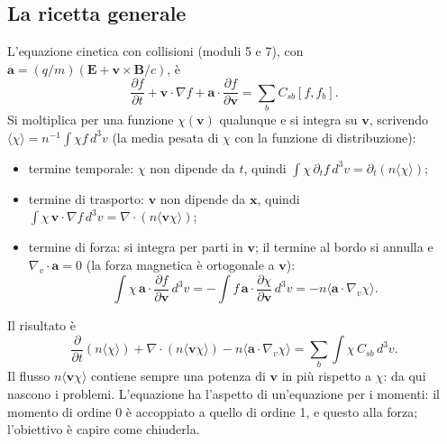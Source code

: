 \subsection{La ricetta generale}
L'equazione cinetica con collisioni (moduli 5 e 7), con $\mathbf{a}=(q/m)(\mathbf{E}+\mathbf{v}\times\mathbf{B}/c)$, è
\begin{equation}
\frac{\partial f}{\partial t}+\mathbf{v}\cdot\nabla f+\mathbf{a}\cdot\frac{\partial f}{\partial\mathbf{v}}=\sum_bC_{sb}[f,f_b].
\end{equation}
Si moltiplica per una funzione $\chi(\mathbf{v})$ qualunque e si integra su $\mathbf{v}$, scrivendo $\langle\chi\rangle=n^{-1}\int\chi f\,d^3v$ (la media pesata di $\chi$ con la funzione di distribuzione):
\begin{itemize}
\item termine temporale: $\chi$ non dipende da $t$, quindi $\int\chi\,\partial_tf\,d^3v=\partial_t(n\langle\chi\rangle)$;
\item termine di trasporto: $\mathbf{v}$ non dipende da $\mathbf{x}$, quindi $\int\chi\,\mathbf{v}\cdot\nabla f\,d^3v=\nabla\cdot(n\langle\mathbf{v}\chi\rangle)$;
\item termine di forza: si integra per parti in $\mathbf{v}$; il termine al bordo si annulla e $\nabla_v\cdot\mathbf{a}=0$ (la forza magnetica è ortogonale a $\mathbf{v}$):
\begin{equation}
\int\chi\,\mathbf{a}\cdot\frac{\partial f}{\partial\mathbf{v}}\,d^3v=-\int f\,\mathbf{a}\cdot\frac{\partial\chi}{\partial\mathbf{v}}\,d^3v=-n\langle\mathbf{a}\cdot\nabla_v\chi\rangle.
\end{equation}
\end{itemize}
Il risultato è
\begin{equation}
\frac{\partial}{\partial t}\left(n\langle\chi\rangle\right)+\nabla\cdot\left(n\langle\mathbf{v}\chi\rangle\right)-n\langle\mathbf{a}\cdot\nabla_v\chi\rangle=\sum_b\int\chi\,C_{sb}\,d^3v .
\end{equation}
Il flusso $n\langle\mathbf{v}\chi\rangle$ contiene sempre una potenza di $\mathbf{v}$ in più rispetto a $\chi$: da qui nascono i problemi. L'equazione ha l'aspetto di un'equazione per i momenti: il momento di ordine 0 è accoppiato a quello di ordine 1, e questo alla forza; l'obiettivo è capire come chiuderla.

